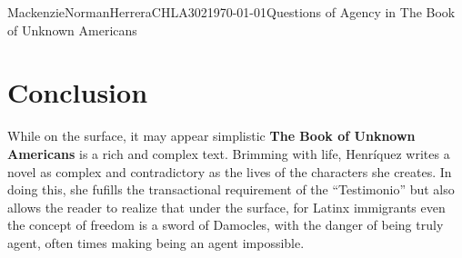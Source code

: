 \documentclass{article}
\begin{document}
\begin{mla}{Mackenzie}{Norman}{Herrera}{CHLA302}{\today}{Questions of Agency in The Book of Unknown Americans}
\section*{Conclusion}
While on the surface, it may appear simplistic \textbf{The Book of Unknown Americans }is a rich and complex text. Brimming with life, Henríquez writes a novel as complex and contradictory as the lives of the characters she creates. In doing this, she fufills the transactional requirement of the ``Testimonio'' but also allows the reader to realize that under the surface, for Latinx immigrants even the concept of freedom is a sword of Damocles, with the danger of being truly agent, often times making being an agent impossible.


\printbibliography

\end{mla}
\end{document}
